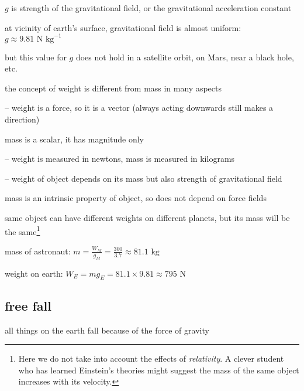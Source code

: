$g$ is strength of the gravitational field, or the gravitational acceleration constant

\cmt at vicinity of earth's surface, gravitational field is almost uniform: $g \approx 9.81 \text{ N kg}^{-1}$

but this value for $g$ does not hold in a satellite orbit, on Mars, near a black hole, etc.

\cmt the concept of weight is different from mass in many aspects

\begin{compactitem}
	\item[--] weight is a force, so it is a vector (always acting downwards still makes a direction)
	
	mass is a scalar, it has magnitude only
	
	\item[--] weight is measured in newtons, mass is measured in kilograms
	
	\item[--] weight of object depends on its mass but also strength of gravitational field
	
	mass is an intrinsic property of object, so does not depend on force fields
	
	same object can have different weights on different planets, but its mass will be the same\footnote{Here we do not take into account the effects of \emph{relativity}. A clever student who has learned Einstein's theories might suggest the mass of the same object increases with its velocity.}
\end{compactitem}


\begin{soln} mass of astronaut: $m = \frac{W_M}{g_M} = \frac{300}{3.7} \approx 81.1 \text{ kg}$

weight on earth: $W_E = mg_E = 81.1 \times 9.81 \approx 795 \text{ N}$ \end{soln}

\subsection*{free fall}

all things on the earth fall because of the force of gravity

